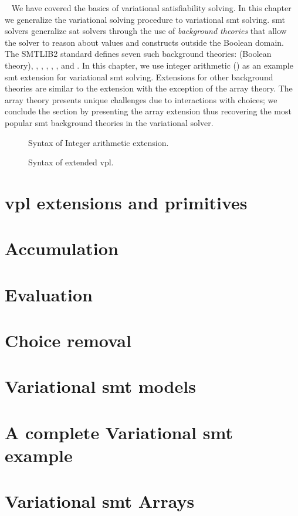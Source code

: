 ~\label{chapter:vsmt}
%
We have covered the basics of variational satisfiability solving. In this
chapter we generalize the variational solving procedure to variational \ac{smt}
solving.
\ac{smt} solvers generalize \ac{sat} solvers through the use of \emph{background
  theories} that allow the solver to reason about values and constructs outside
the Boolean domain. The SMTLIB2 standard defines seven such background theories:
 (Boolean theory), , ,
, , , and . In this chapter,
we use integer arithmetic () as an example \ac{smt} extension for
variational \ac{smt} solving. Extensions for other background theories are
similar to the  extension with the exception of the array theory. The
array theory presents unique challenges due to interactions with choices; we
conclude the section by presenting the array extension thus recovering the most
popular \ac{smt} background theories in the variational solver.
\begin{figure}
  \centering
  
  \caption{Syntax of Integer arithmetic extension.}%
  \label{fig:arith:stx}
\end{figure}
%
\begin{figure}

\centering
\caption{Syntax of extended \ac{vpl}.}%
\label{fig:arith:vpl}
\end{figure}
%
\section{\ac{vpl} extensions and primitives}
%

\section{Accumulation}
%

\section{Evaluation}
%

\section{Choice removal}
%

\section{Variational \ac{smt} models}
%

\section{A complete Variational \ac{smt} example}


\section{Variational \ac{smt} Arrays}


